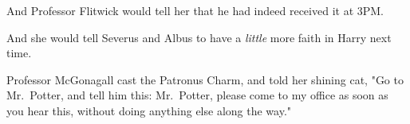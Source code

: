 And Professor Flitwick would tell her that he had indeed received it at 3PM.

And she would tell Severus and Albus to have a \emph{little} more faith in 
Harry next time.

Professor McGonagall cast the Patronus Charm, and told her shining cat, "Go to 
Mr.~Potter, and tell him this: Mr.~Potter, please come to my office as soon as 
you hear this, without doing anything else along the way."
